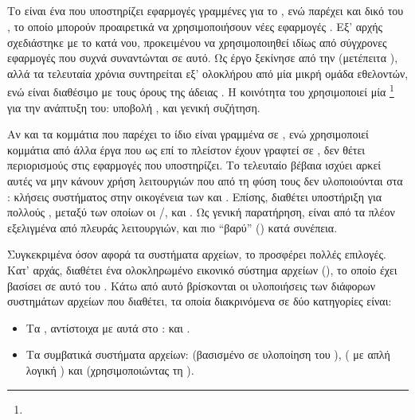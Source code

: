 \subsection{\osv{}}

Το \osv{} είναι ένα  που υποστηρίζει εφαρμογές γραμμένες
για το \linux{}, ενώ παρέχει και δικό του , το οποίο μπορούν
προαιρετικά να χρησιμοποιήσουν νέες εφαρμογές \cite{osv}. Εξ' αρχής σχεδιάστηκε
με το  κατά νου, προκειμένου να χρησιμοποιηθεί ιδίως από σύγχρονες
εφαρμογές που συχνά συναντώνται σε αυτό. Ως έργο ξεκίνησε από την  (μετέπειτα ), αλλά τα τελευταία χρόνια συντηρείται εξ'
ολοκλήρου από μία μικρή ομάδα εθελοντών, ενώ είναι διαθέσιμο με τους όρους της
άδειας . Η κοινότητα του χρησιμοποιεί μία %
\footnote{}
για την ανάπτυξη του: υποβολή ,  και γενική
συζήτηση.

Αν και τα κομμάτια που παρέχει το ίδιο είναι γραμμένα σε , ενώ
χρησιμοποιεί κομμάτια από άλλα έργα που ως επί το πλείστον έχουν γραφτεί σε
, δεν θέτει περιορισμούς στις εφαρμογές που υποστηρίζει. Το
τελευταίο βέβαια ισχύει αρκεί αυτές να μην κάνουν χρήση λειτουργιών που από τη
φύση τους δεν υλοποιούνται στα : κλήσεις συστήματος στην
οικογένεια των \texttt{} και \texttt{}. Επίσης, διαθέτει
υποστήριξη για πολλούς , μεταξύ των οποίων οι \qemu{}/,
 και  \cite{firecracker}.
Ως γενική παρατήρηση, είναι από τα πλέον εξελιγμένα  από πλευράς
λειτουργιών, και πιο ``βαρύ'' () κατά συνέπεια.

Συγκεκριμένα όσον αφορά τα συστήματα αρχείων, το \osv{} προσφέρει πολλές
επιλογές. Κατ' αρχάς, διαθέτει ένα ολοκληρωμένο εικονικό σύστημα αρχείων
(), το οποίο έχει βασίσει σε αυτό του 
\cite{prex}.
Κάτω από αυτό βρίσκονται οι υλοποιήσεις των διάφορων συστημάτων αρχείων που
διαθέτει, τα οποία διακρινόμενα σε δύο κατηγορίες είναι:
\begin{itemize}
    \item Τα , αντίστοιχα με αυτά στο \linux{}:
           και .
    \item Τα συμβατικά συστήματα αρχείων:  (βασισμένο σε υλοποίηση του
          ),  ( με απλή
          λογική ) και  (χρησιμοποιώντας τη 
          \cite{libnfs}).
\end{itemize}

